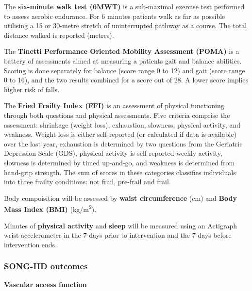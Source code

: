 \documentclass[
]{article}
\begin{document}
\label{outcome:6mwt}
The \textbf{six-minute walk test (6MWT)} \cites{butland1982two}{buvcar2016six} is a sub-maximal exercise test performed to assess aerobic endurance. 
For 6 minutes patients walk as far as possible utilising a 15 or 30-metre stretch of uninterrupted pathway as a course.
The total distance walked is reported (metres).

\label{outcome:poma}
The \textbf{Tinetti Performance Oriented Mobility Assessment (POMA)} \cites{tinetti1986fall}{wyngaert2020associations} is a battery of assessments aimed at measuring a patients gait and balance abilities.
Scoring is done separately for balance (score range 0 to 12) and gait (score range 0 to 16), and the two results combined for a score out of 28.
A lower score implies higher risk of falls.

\label{outcome:ffi}
The \textbf{Fried Frailty Index (FFI)} \cites{fried2001frailty}{het2015fried} is an assessment of physical functioning through both questions and physical assessments.
Five criteria comprise the assessment: shrinkage (weight loss), exhaustion, slowness, physical activity, and weakness.
Weight loss is either self-reported (or calculated if data is available) over the last year, exhaustion is determined by two questions from the Geriatric Depression Scale (GDS), physical activity is self-reported weekly activity, slowness is determined by timed up-and-go, and weakness is determined from hand-grip strength.
The sum of scores in these categories classifies individuals into three frailty conditions: not frail, pre-frail and frail. 

\label{outcome:body}
Body compoisition will be assessed by \textbf{waist circumference} (cm) and \textbf{Body Mass Index (BMI)} (kg/m\textsuperscript{2}).

\label{outcome:actigraph}
Minutes of \textbf{physical activity} and \textbf{sleep} will be measured using an Actigraph wrist accelerometer in the 7 days prior to intervention and the 7 days before intervention ends.

\hypertarget{song-outcomes}{
  \subsubsection{SONG-HD outcomes}\label{song-outcomes}}

\textbf{Vascular access function}
\end{document}
